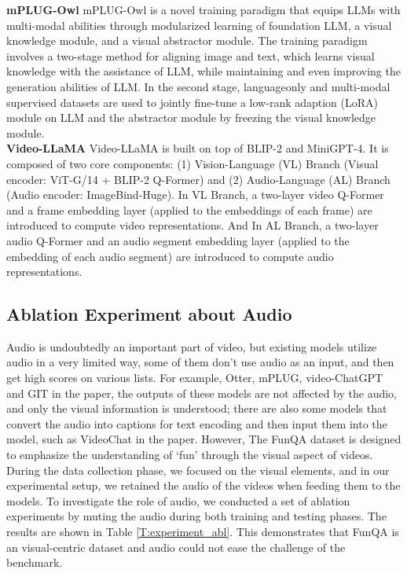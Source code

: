 \noindent\textbf{mPLUG-Owl}\quad
mPLUG-Owl is a novel training paradigm that equips LLMs with multi-modal abilities through modularized learning of foundation LLM, a visual knowledge module, and a visual abstractor module. The training paradigm involves a two-stage method for aligning image and text, which learns visual knowledge with the assistance of LLM,
while maintaining and even improving the generation abilities of LLM. In the second stage, languageonly and multi-modal supervised datasets are used to jointly fine-tune a low-rank
adaption (LoRA) module on LLM and the abstractor module by freezing the visual knowledge module.\\
\noindent\textbf{Video-LLaMA}\quad
Video-LLaMA is built on top of BLIP-2 and MiniGPT-4. It is composed of two core components: (1) Vision-Language (VL) Branch (Visual encoder: ViT-G/14 + BLIP-2 Q-Former) and (2) Audio-Language (AL) Branch (Audio encoder: ImageBind-Huge). In VL Branch, a two-layer video Q-Former and a frame embedding layer (applied to the embeddings of each frame) are introduced to compute video representations. And In AL Branch, a two-layer audio Q-Former and an audio segment embedding layer (applied to the embedding of each audio segment) are introduced to compute audio representations.\\

\subsection{Ablation Experiment about Audio}
Audio is undoubtedly an important part of video, but existing models utilize audio in a very limited way, some of them don’t use audio as an input, and then get high scores on various lists. For example, Otter, mPLUG, video-ChatGPT and GIT in the paper, the outputs of these models are not affected by the audio, and only the visual information is understood; there are also some models that convert the audio into captions for text encoding and then input them into the model, such as VideoChat in the paper.
However, The FunQA dataset is designed to emphasize the understanding of ‘fun’ through the visual aspect of videos. During the data collection phase, we focused on the visual elements, and in our experimental setup, we retained the audio of the videos when feeding them to the models. To investigate the role of audio, we conducted a set of ablation experiments by muting the audio during both training and testing phases. The results are shown in Table \ref{T:experiment_abl}. This demonstrates that FunQA is an visual-centric dataset and audio could not ease the challenge of the benchmark.

